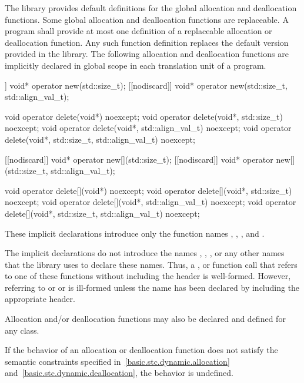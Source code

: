\pnum
The library provides default definitions for the global allocation and
deallocation functions. Some global allocation and deallocation
functions are replaceable. A \Cpp{} program shall
provide at most one definition of a replaceable allocation or
deallocation function. Any such function definition replaces the default
version provided in the library. The
following allocation and deallocation functions
are implicitly declared in global scope in each translation unit of a
program.

\begin{codeblock}
[[nodiscard]] void* operator new(std::size_t);
[[nodiscard]] void* operator new(std::size_t, std::align_val_t);

void operator delete(void*) noexcept;
void operator delete(void*, std::size_t) noexcept;
void operator delete(void*, std::align_val_t) noexcept;
void operator delete(void*, std::size_t, std::align_val_t) noexcept;

[[nodiscard]] void* operator new[](std::size_t);
[[nodiscard]] void* operator new[](std::size_t, std::align_val_t);

void operator delete[](void*) noexcept;
void operator delete[](void*, std::size_t) noexcept;
void operator delete[](void*, std::align_val_t) noexcept;
void operator delete[](void*, std::size_t, std::align_val_t) noexcept;
\end{codeblock}

These implicit declarations introduce only the function names
 ,  ,
 , and 
. \begin{note} The implicit declarations do not introduce
the names ,
,
,
or any other names that the library uses to
declare these names. Thus, a ,
 or function call that refers to one of
these functions without including the header  is
well-formed. However, referring to 
or 
or 
is ill-formed unless the name has been declared
by including the appropriate header. \end{note} Allocation and/or
deallocation functions may also be declared and defined for any
class.

\pnum
If the behavior of an allocation or deallocation function
does not satisfy the semantic constraints
specified in~\ref{basic.stc.dynamic.allocation}
and~\ref{basic.stc.dynamic.deallocation},
the behavior is undefined.

